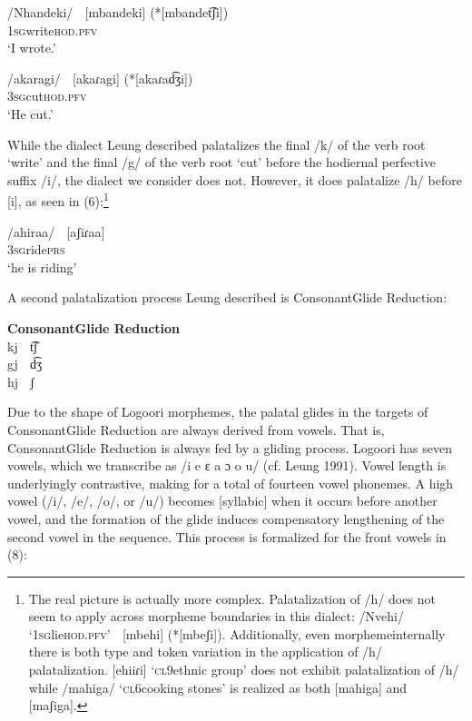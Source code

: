 \documentclass[output=paper]{langsci/langscibook}
\begin{document}
\ea{}
 /Nhandeki/    [mbandeki]  (*[mbandet͡ʃi])  \\{}
\textsc{1sg}write\textsc{hod.pfv}\\{}
\glt ‘I wrote.’
\z 

\ea{}
 /akaragi/    \textsc{[}akaɾagi]  (*[akaɾad͡ʒi])\\{}
\textsc{3sg}cut\textsc{hod.pfv}\\{}
\glt ‘He cut.’\\{}
\z

While the dialect Leung described palatalizes the final /k/ of the verb root ‘write’ and the final /g/ of the verb root ‘cut’ before the hodiernal perfective suffix /i/, the dialect we consider does not. However, it does palatalize /h/ before [i], as seen in (6):\footnote{   The real picture is actually more complex. Palatalization of /h/ does not seem to apply across morpheme boundaries in this dialect: /Nvehi/ ‘1\textsc{sg}lie\textsc{hod.pfv}’  [mbehi] (*[mbeʃi]). Additionally, even morphemeinternally there is both type and token variation in the application of /h/ palatalization. [ehiiɾi] ‘\textsc{cl}9ethnic group’ does not exhibit palatalization of /h/ while /mahiga/ ‘\textsc{cl}6cooking stones’ is realized as both [mahiga] and [maʃiga].} 

\ea{}
 /ahiraa/    [aʃiɾaa]\\{}
\textsc{3sg}ride\textsc{prs}\\{}
\glt ‘he is riding’
\z

A second palatalization process Leung described is ConsonantGlide Reduction:

\ea{} 
 \textbf{Consonant}\textbf{Glide Reduction} \citep[116]{Leung1991}\\{}
kj  t͡ʃ \\{}
gj  d͡ʒ \\{}
hj  ʃ \\{}
\z

Due to the shape of Logoori morphemes, the palatal glides in the targets of ConsonantGlide Reduction are always derived from vowels. That is, ConsonantGlide Reduction is always fed by a gliding process. Logoori has seven vowels, which we transcribe as /i e ɛ a ɔ o u/ (cf. Leung 1991). Vowel length is underlyingly contrastive, making for a total of fourteen vowel phonemes. A high vowel (/i/, /e/, /o/, or /u/) becomes [syllabic] when it occurs before another vowel, and the formation of the glide induces compensatory lengthening of the second vowel in the sequence. This process is formalized for the front vowels in (8):
\end{document}
